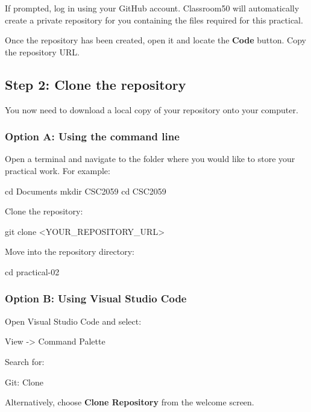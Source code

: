 \documentclass{csc2059practical}
\begin{document}
If prompted, log in using your GitHub account. Classroom50 will automatically create a private repository for you containing the files required for this practical.

Once the repository has been created, open it and locate the \textbf{Code} button. Copy the repository URL.

\subsection{Step 2: Clone the repository}

You now need to download a local copy of your repository onto your computer.

\subsubsection{Option A: Using the command line}

Open a terminal and navigate to the folder where you would like to store your practical work. For example:

\begin{bashcode}
cd Documents
mkdir CSC2059
cd CSC2059
\end{bashcode}

Clone the repository:

\begin{bashcode}
git clone <YOUR_REPOSITORY_URL>
\end{bashcode}

Move into the repository directory:

\begin{bashcode}
cd practical-02
\end{bashcode}

\subsubsection{Option B: Using Visual Studio Code}

Open Visual Studio Code and select:

\begin{terminal}
View -> Command Palette
\end{terminal}

Search for:

\begin{terminal}
Git: Clone
\end{terminal}

Alternatively, choose \textbf{Clone Repository} from the welcome screen.
\end{document}
